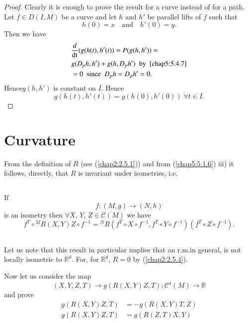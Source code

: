 \begin{proof}
Clearly it is enough to prove the result for a curve instead of for a
path. Let $f\in D(I,M)$ be a curve and let $h$ and $h'$ be parallel
lifts of $f$ such that
$$
h(0)=x\quad\text{and}\quad h'(0)=y.
$$
Then we have
\begin{align*}
& \frac{d}{\operatorname{dt}}(g(h(t),h'(t))=P(g(h,h'))=\\
& g(D_{p}h,h')+g(h,D_{p}h')\text{ \ by \ \eqref{chap5:5.4.7}}\\
&= 0\text{ \  since \ } D_{p}h=D_{p}h'=0.
\end{align*}
Hence\pageoriginale $g(h,h')$ is constant on $I$. Hence
$$
g(h(t),h'(t))=g(h(0), h'(0)) \; \forall t\in I.
$$
\end{proof}

\section{Curvature}\label{chap5:sec5}

From the definition of $R$ (see (\ref{chap2:2.5.1})) and from
(\ref{chap5:5.1.6}) iii) it follows, directly, that $R$ is invariant
under isometries, i.e. 

\subsection{}\label{chap5:5.5.1}


\begin{prop*}
If 
$$
f:(M,g)\to (N,h)
$$
is an isometry then $\forall X$, $Y$, $Z\in\mathscr{C}(M)$ we have
$$
f^{T}\circ {}^{M}R(X,Y)Z\circ f^{-1}={}^{N}R(f^{T}\circ X\circ f^{-1},
f^{T}\circ Y\circ f^{-1})(f^{T}\circ Z\circ f^{-1}).
$$
\end{prop*}

\subsection{}\label{chap5:5.5.2}

\begin{remark*}
Let us note that this result in particular implies that an r.m.\@ in
general, is not locally isometric to $\mathbb{R}^{d}$. For, for
$\mathbb{R}^{d}$, $R=0$ by (\ref{chap2:2.5.4}).

Now let us consider the map
\begin{equation*}
(X,Y,Z,T)\to
  g(R(X,Y)Z,T);\mathscr{C}^{4}(M)\to\mathbb{R}\tag{5.5.3}\label{chap5:5.5.3} 
\end{equation*}
and prove
\begin{align*}
g(R(X,Y)Z,T) &= -g(R(X,Y)T,Z)\tag*{(5.5.4) C.T.3}\label{chap5:5.5.4C.T.3}\\
g(R(X,Y)Z,T) &= g(R(Z,T)X,Y)\tag*{(5.5.5) C.T.4}\label{chap5:5.5.5C.T.4}
\end{align*}
\end{remark*}

